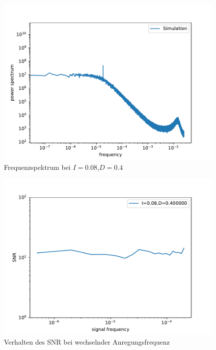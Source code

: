 \documentclass[12pt,a4paper]{article}
\begin{document}
\begin{figure}[H]
	\centering
	\includegraphics[scale=0.9]{inapikrealfrange8a6.pdf}
	\caption{Frequenzspektrum bei $I=0.08$,$D=0.4$}
	\label{snrdrange}
\end{figure}
\begin{figure}[H]
	\centering
	\includegraphics[scale=0.9]{snrfrange8a.pdf}
	\caption{Verhalten des SNR bei wechselnder Anregungsfrequenz}
	\label{snfrange}
\end{figure}
\end{document}
